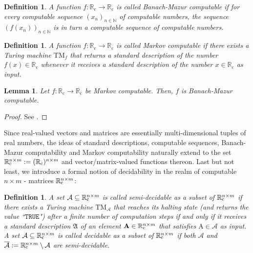 \documentclass[conference]{IEEEtran}
\def\A{{\mathcal A}}
\def\W{{\mathcal W}}
\def\NN{{\mathbb N}}
\def\RR{{\mathbb R}}
\newcommand{\RRc}{\RR_{\mathrm{c}}}
\def\mA{\bm{\mathrm{A}}}
\newcommand{\TM}{\mathrm{TM}}
\newcommand{\RRcP}[1]{\mathrlap{\phantom{\RR}_{\mathrm{c}}}\RR^{#1}}
\newcommand{\revision}[1]{}
\newtheorem{Definition}[Theorem]{Definition}
\newtheorem{Lemma}[Theorem]{Lemma}
\begin{document}
	\begin{Definition}  \label{Borel}
						A function \(f : \RRc \to \RRc\) is called Banach-Mazur computable %
						if for every computable sequence \((x_n)_{n\in\NN}\) of computable numbers, the sequence
						\((f(x_n))_{n\in\NN}\) is in turn a computable sequence of computable numbers.
	\end{Definition}
	
	\begin{Definition}  \label{Borel}
						A function \(f : \RRc \to \RRc\) is called Markov computable %
						if there exists a Turing machine \(\TM_f\) that returns a standard description
						of the number \(f(x) \in \RRc\) whenever it receives a standard description of the number \(x\in \RRc\) as input.
	\end{Definition}
	
	\begin{Lemma}	Let \(f : \RRc \to \RRc\) be Markov computable. Then, \(f\) is Banach-Mazur computable.	
	\end{Lemma}\begin{proof}
					See \cite{AB14}.
	\end{proof}

	\noindent Since real-valued vectors and matrices are essentially multi-dimensional tuples of real numbers, the ideas of standard descriptions, computable sequences,
	Banach-Mazur computability and Markov computability naturally extend to the set \(\RRcP{n\times m} := (\RRc)^{n\times m}\) and vector/matrix-valued functions thereon. 
	Last but not least, we introduce a formal notion of decidability in the realm of computable \(n\times m\) - matrices \(\RRcP{n\times m}\):
	\revision{We need a definition of decidability with respect to \(\W\) and channel classification problems here.}
	\begin{Definition}  \label{semi}
						A set \(\A \subseteq \RRcP{n\times m}\) is called \emph{semi-decidable} as a subset of \(\RRcP{n\times m}\) 
						if there exists a Turing machine \(\TM_{\A}\) that reaches its halting state (and returns the value ``\(\mathtt{TRUE}\)") 
						after a finite number of computation steps if and only if it receives a standard description \(\mathfrak{A}\) of an element 
						\(\mA \in \RRcP{n\times m}\) that satisfies \(\mA\in\A\) as input. A set \(\A \subseteq \RRcP{n\times m}\) is called 
						\emph{decidable} as a subset of \(\RRcP{n\times m}\) if both \(\A\) and \(\overline{\A} := \RRcP{n\times m}\setminus\A\) are semi-decidable.
	\end{Definition} 
	
\end{document}
